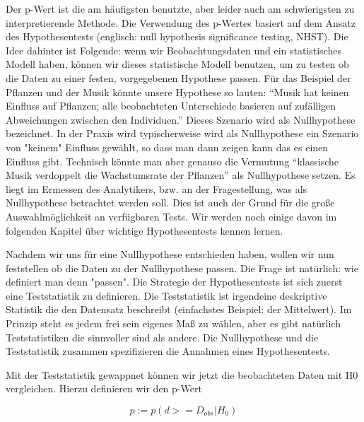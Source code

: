 \documentclass[a4paper,twoside]{tufte-book}\usepackage[]{graphicx}\usepackage[]{color}
\begin{document}
Der p-Wert ist die am häufigsten benutzte, aber leider auch am schwierigsten zu interpretierende Methode. Die Verwendung des p-Wertes basiert auf dem Ansatz des Hypothesentests (englisch: null hypothesis significance testing, NHST). Die Idee dahinter ist Folgende: wenn wir Beobachtungsdaten und ein statistisches Modell haben, können wir dieses statistische Modell benutzen, um zu testen ob die Daten zu einer festen, vorgegebenen Hypothese passen. Für das Beispiel der Pflanzen und der Musik könnte unsere Hypothese so lauten: "`Musik hat keinen Einfluss auf Pflanzen; alle beobachteten Unterschiede basieren auf zufälligen Abweichungen zwischen den Individuen."' Dieses Szenario wird als Nullhypothese bezeichnet.  In der Praxis wird typischerweise wird als Nullhypothese ein Szenario von "keinem" Einfluss gewählt, so dass man dann zeigen kann das es einen Einfluss gibt. Technisch könnte man aber genauso die Vermutung "`klassische Musik verdoppelt die Wachstumsrate der Pflanzen"' als Nullhypothese setzen. Es liegt im Ermessen des Analytikers, bzw. an der Fragestellung, was als Nullhypothese betrachtet werden soll. Dies ist auch der Grund für die große Auswahlmöglichkeit an verfügbaren Tests. Wir werden noch einige davon im folgenden Kapitel über wichtige Hypothesentests kennen lernen.

Nachdem wir uns für eine Nullhypothese entschieden haben, wollen wir nun feststellen ob die Daten zu der Nullhypothese passen. Die Frage ist natürlich: wie definiert man denn "passen". Die Strategie der Hypothesentests ist sich zuerst eine Teststatistik zu definieren. Die Teststatistik ist irgendeine deskriptive Statistik die den Datensatz beschreibt (einfachstes Beispiel: der Mittelwert). Im Prinzip steht es jedem frei sein eigenes Maß zu wählen, aber es gibt natürlich Teststatistiken die sinnvoller sind als andere. Die Nullhypothese und die Teststatistik zusammen spezifizieren die Annahmen eines Hypothesentests. 

Mit der Teststatistik gewappnet können wir jetzt die beobachteten Daten mit H0 vergleichen. Hierzu definieren wir den p-Wert 

\begin{equation}
p := p(d >= D_{obs} | H_0)
\end{equation}
\end{document}
